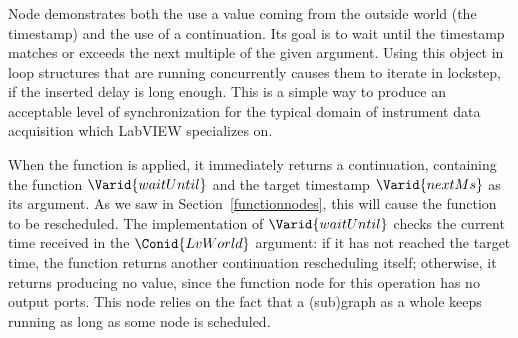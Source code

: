 \subsubsection{}
\label{waituntilnextms}

Node  demonstrates both the use a value coming
from the outside world (the timestamp) and the use of a continuation.
Its goal is to wait until the timestamp matches or exceeds the next
multiple of the given argument. Using this object in loop structures
that are running concurrently causes them to iterate in lockstep,
if the inserted delay is long enough. This is a simple way to produce
an acceptable level of synchronization for the typical domain of
instrument data acquisition which LabVIEW specializes on.

When the function is applied, it immediately returns a continuation,
containing the function \ensuremath{\Varid{waitUntil}} and the target timestamp \ensuremath{\Varid{nextMs}} as its
argument. As we saw in Section~\ref{functionnodes}, this will cause the
function to be rescheduled. The implementation of \ensuremath{\Varid{waitUntil}} checks
the current time received in the \ensuremath{\Conid{LvWorld}} argument: if it has
not reached the target time, the function returns another continuation
rescheduling itself; otherwise, it returns producing no value, since
the function node for this operation has no output ports. This node
relies on the fact that a (sub)graph as a whole keeps running as long
as some node is scheduled.

